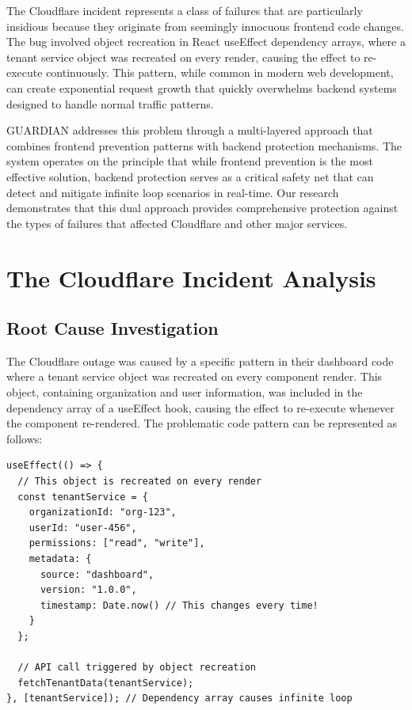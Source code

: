 \documentclass[10pt]{article}
\begin{document}
The Cloudflare incident represents a class of failures that are particularly insidious because they originate from seemingly innocuous frontend code changes. The bug involved object recreation in React useEffect dependency arrays, where a tenant service object was recreated on every render, causing the effect to re-execute continuously. This pattern, while common in modern web development, can create exponential request growth that quickly overwhelms backend systems designed to handle normal traffic patterns.

GUARDIAN addresses this problem through a multi-layered approach that combines frontend prevention patterns with backend protection mechanisms. The system operates on the principle that while frontend prevention is the most effective solution, backend protection serves as a critical safety net that can detect and mitigate infinite loop scenarios in real-time. Our research demonstrates that this dual approach provides comprehensive protection against the types of failures that affected Cloudflare and other major services.

\section{The Cloudflare Incident Analysis}

\subsection{Root Cause Investigation}

The Cloudflare outage was caused by a specific pattern in their dashboard code where a tenant service object was recreated on every component render. This object, containing organization and user information, was included in the dependency array of a useEffect hook, causing the effect to re-execute whenever the component re-rendered. The problematic code pattern can be represented as follows:

\begin{lstlisting}[caption={Problematic Effect Pattern}]
useEffect(() => {
  // This object is recreated on every render
  const tenantService = {
    organizationId: "org-123",
    userId: "user-456",
    permissions: ["read", "write"],
    metadata: {
      source: "dashboard",
      version: "1.0.0",
      timestamp: Date.now() // This changes every time!
    }
  };
  
  // API call triggered by object recreation
  fetchTenantData(tenantService);
}, [tenantService]); // Dependency array causes infinite loop
\end{lstlisting}
\end{document}
